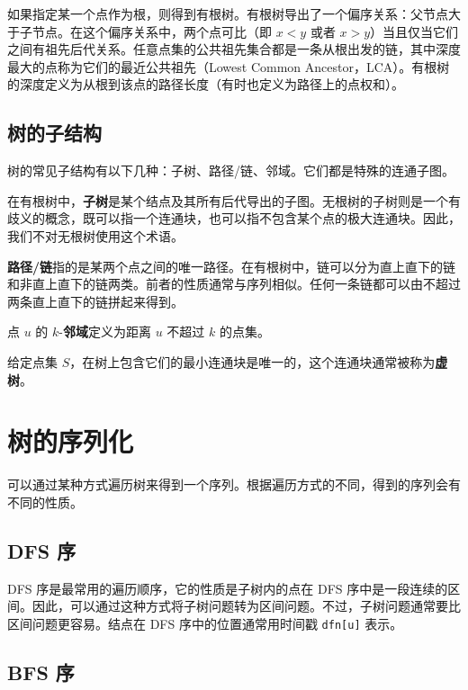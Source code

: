 如果指定某一个点作为根，则得到有根树。有根树导出了一个偏序关系：父节点大于子节点。在这个偏序关系中，两个点可比（即 $x<y$ 或者 $x>y$）当且仅当它们之间有祖先后代关系。任意点集的公共祖先集合都是一条从根出发的链，其中深度最大的点称为它们的最近公共祖先（Lowest Common Ancestor，LCA）。有根树的深度定义为从根到该点的路径长度（有时也定义为路径上的点权和）。

\subsection{树的子结构}

树的常见子结构有以下几种：子树、路径/链、邻域。它们都是特殊的连通子图。

\begin{definition}
    在有根树中，\textbf{子树}是某个结点及其所有后代导出的子图。无根树的子树则是一个有歧义的概念，既可以指一个连通块，也可以指不包含某个点的极大连通块。因此，我们不对无根树使用这个术语。

    \textbf{路径/链}指的是某两个点之间的唯一路径。在有根树中，链可以分为直上直下的链和非直上直下的链两类。前者的性质通常与序列相似。任何一条链都可以由不超过两条直上直下的链拼起来得到。

    点 $u$ 的 $k$-\textbf{邻域}定义为距离 $u$ 不超过 $k$ 的点集。
\end{definition}

给定点集 $S$，在树上包含它们的最小连通块是唯一的，这个连通块通常被称为\textbf{虚树}。


\section{树的序列化}

可以通过某种方式遍历树来得到一个序列。根据遍历方式的不同，得到的序列会有不同的性质。

\subsection{DFS 序}

DFS 序是最常用的遍历顺序，它的性质是子树内的点在 DFS 序中是一段连续的区间。因此，可以通过这种方式将子树问题转为区间问题。不过，子树问题通常要比区间问题更容易。结点在 DFS 序中的位置通常用时间戳 \texttt{dfn[u]} 表示。



\subsection{BFS 序}

